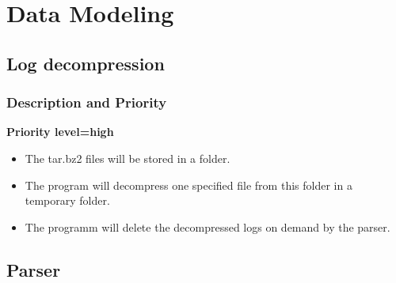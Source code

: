 \documentclass{scrreprt}
\begin{document}
\section{Data Modeling}

\subsection{Log decompression}
\subsubsection{Description and Priority}
\textbf{Priority level=high}\\

\begin{itemize}
  \item The tar.bz2 files will be stored in a folder.
  \item The program will decompress one specified file from this folder in a temporary folder.
  \item The programm will delete the decompressed logs on demand by the parser.
\end{itemize}

\subsection{Parser}
\end{document}
